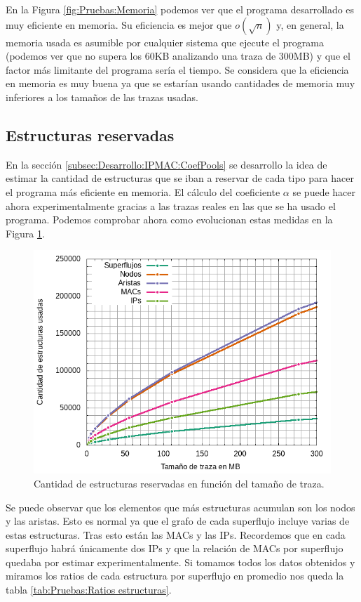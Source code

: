 \documentclass[twoside, 12pt]{epstfg}
\begin{document}
En la Figura \ref{fig:Pruebas:Memoria} podemos ver que el programa desarrollado es muy eficiente en memoria. Su eficiencia es mejor que $o(\sqrt{n})$ y, en general, la memoria usada es asumible por cualquier sistema que ejecute el programa (podemos ver que no supera los 60KB analizando una traza de 300MB) y que el factor más limitante del programa sería el tiempo. Se considera que la eficiencia en memoria es muy buena ya que se estarían usando cantidades de memoria muy inferiores a los tamaños de las trazas usadas. 

\subsection{Estructuras reservadas}
En la sección \ref{subsec:Desarrollo:IPMAC:CoefPools} se desarrollo la idea de estimar la cantidad de estructuras que se iban a reservar de cada tipo para hacer el programa más eficiente en memoria. El cálculo del coeficiente $\alpha$ se puede hacer ahora experimentalmente gracias a las trazas reales en las que se ha usado el programa. Podemos comprobar ahora como evolucionan estas medidas en la Figura \ref{fig:Pruebas:Estructuras}.


\begin{figure}[H]
\centering
\includegraphics[scale=0.8]{latex/gnuplot/png/structures.png}
\caption[Gráfica de estructuras utilizadas]{Cantidad de estructuras reservadas en función del tamaño de traza.}
\label{fig:Pruebas:Estructuras}
\end{figure}

Se puede observar que los elementos que más estructuras acumulan son los nodos y las aristas. Esto es normal ya que el grafo de cada superflujo incluye varias de estas estructuras. Tras esto están las MACs y las IPs. Recordemos que en cada superflujo habrá únicamente dos IPs y que la relación de MACs por superflujo quedaba por estimar experimentalmente. Si tomamos todos los datos obtenidos y miramos los ratios de cada estructura por superflujo en promedio nos queda la tabla \ref{tab:Pruebas:Ratios estructuras}.
\end{document}
